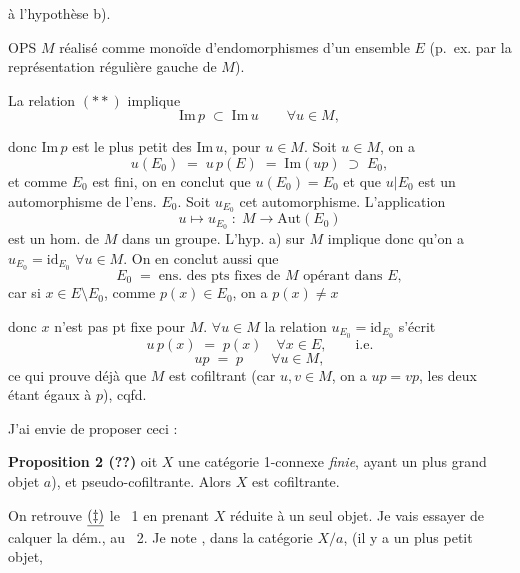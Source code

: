 \documentclass[11pt,a4paper]{article}
\begin{document}

à l'hypothèse b).

OPS $M$ réalisé comme monoïde d'endomorphismes d'un ensemble  $E$
(p.~ex. par la représentation régulière gauche de $M$).

La relation $(**)$ implique
\[
  \mathrm{Im}\, p \;\subset\; \mathrm{Im}\, u \qquad \forall u \in M,
\]

donc $\mathrm{Im}\, p$ est le plus petit des $\mathrm{Im}\, u$, pour
$u \in M$. Soit $u \in M$, on a
\[
  u(E_0) \;=\; u\, p(E) \;=\; \mathrm{Im}(up) \;\supset\; E_0 ,
\]
et comme $E_0$ est fini, on en conclut que $u(E_0) = E_0$ et que $u|E_0$ est un
automorphisme de l'ens. $E_0$. Soit $u_{E_0}$ cet
automorphisme. L'application
\[
  u \longmapsto u_{E_0} \;:\; M \longrightarrow \mathrm{Aut}(E_0)
\]
est un hom. de $M$ dans un groupe. L'hyp. a) sur $M$ implique donc qu'on a
$u_{E_0} = \mathrm{id}_{E_0}$ $\forall u \in M$. On en conclut aussi que
\[
  E_0 \;=\; \text{ens. des pts fixes de } M \text{ opérant dans } E,
\]
car si $x \in E \setminus E_0$, comme $p(x) \in E_0$, on a $p(x) \neq x$


donc $x$ n'est pas pt fixe pour $M$. 
$\forall u \in M$ la relation $u_{E_0} = \mathrm{id}_{E_0}$ s'écrit \ill{}
\[
  u\, p(x) \;=\; p(x) \quad \forall x \in E, \qquad \text{i.e.}
\]
\[
  up \;=\; p \qquad \forall u \in M,
\]
ce qui prouve déjà que $M$ est cofiltrant (car $u, v \in M$, on a $up = vp$,
les deux  étant égaux à $p$), cqfd.

J'ai envie de proposer ceci :

\textbf{Proposition 2 (??)} oit $X$ une catégorie 1-connexe
\emph{finie}, ayant un  plus grand objet $a$), et
pseudo-cofiltrante. Alors $X$ est cofiltrante.

On retrouve $\uncertain{(\ddagger)}$ le \ill{}~1 en prenant $X$ réduite à un
seul objet. Je vais essayer de calquer la dém., au \ill{}~2. Je note
, \ill{} dans la catégorie $X/a$, (il y a
un plus petit objet,
\end{document}
